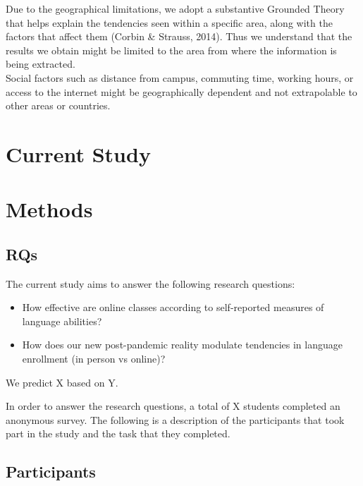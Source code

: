 \documentclass[
  man]{apa6}
\begin{document}
Due to the geographical limitations, we adopt a substantive Grounded Theory that helps explain the tendencies seen within a specific area, along with the factors that affect them (Corbin \& Strauss, 2014).
Thus we understand that the results we obtain might be limited to the area from where the information is being extracted.\\
Social factors such as distance from campus, commuting time, working hours, or access to the internet might be geographically dependent and not extrapolable to other areas or countries.

\hypertarget{current-study}{%
\section{Current Study}\label{current-study}}

\hypertarget{methods}{%
\section{Methods}\label{methods}}

\hypertarget{rqs}{%
\subsection{RQs}\label{rqs}}

The current study aims to answer the following research questions:

\begin{itemize}
\item
  How effective are online classes according to self-reported measures of language abilities?
\item
  How does our new post-pandemic reality modulate tendencies in language enrollment (in person vs online)?
\end{itemize}

We predict X based on Y.

In order to answer the research questions, a total of X students completed an anonymous survey. The following is a description of the participants that took part in the study and the task that they completed.

\hypertarget{participants}{%
\subsection{Participants}\label{participants}}
\end{document}

